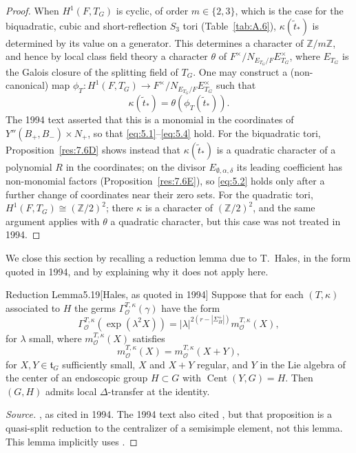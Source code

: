 \documentclass[12pt,letterpaper]{amsart}
\theoremstyle{plain}
\theoremstyle{definition}
\theoremstyle{remark}
\theoremstyle{definition}
\newcommand{\zzz}{\mathbb{Z}}
\DeclareMathOperator{\Cent}{Cent}
\begin{document}
\begin{proof}
When $H^1(F,T_G)$ is cyclic, of order $m\in \{2,3\}$, which is the case for
the biquadratic, cubic and short-reflection $S_3$ tori
(Table~\ref{tab:A.6}), $\kappa(\tilde{t}_*)$ is determined by its value on a
generator. This determines a character of $\zzz/m\zzz$, and
hence by local class field theory a
character $\theta$ of $F^\times/N_{E_{T_G}/F}E_{T_G}^\times$, where $E_{T_G}$
is the Galois closure of the splitting field of $T_G$. One may
construct a (non-canonical) map
$\phi_T:H^1(F,T_G) \rightarrow F^\times/N_{E_{T_G}/F}E_{T_G}^\times$
such that
\[
\kappa(\tilde{t}_*)=\theta(\phi_T(\tilde{t}_*)).
\]
The 1994 text asserted that this is a monomial in the coordinates of
$Y''(B_+,B_-)\times N_+$, so that \eqref{eq:5.1}--\eqref{eq:5.4} hold. For
the biquadratic tori, Proposition~\ref{res:7.6D} shows instead that
$\kappa(\tilde t_*)$ is a quadratic character of a polynomial $R$ in the
coordinates; on the divisor $E_{\emptyset,\alpha,\delta}$ its leading
coefficient has non-monomial factors (Proposition~\ref{res:7.6E}), so
\eqref{eq:5.2} holds only after a further change of coordinates near their
zero sets.
For the quadratic tori, $H^1(F,T_G)\cong(\zzz/2)^2$; there $\kappa$ is a
character of $(\zzz/2)^2$, and the same argument applies with $\theta$ a
quadratic character, but this case was not treated in 1994.
\end{proof}

We close this section by recalling a reduction lemma
due to T.~Hales, in the form quoted in 1994, and by explaining why it does
not apply here.

\begin{res}{Reduction Lemma}{5.19}[Hales, as quoted in 1994]\label{res:5.19}
Suppose that for each $(T,\kappa)$
associated to $H$
the germs $\Gamma_{{\mathcal O}}^{T,\kappa}(\gamma)$ have the form
\[
\Gamma_{{\mathcal O}}^{T,\kappa}(\exp(\lambda^2 X))=
|\lambda|^{2(r-|\Sigma_H^+|)}m_{{\mathcal O}}^{T,\kappa}(X),
\]
for $\lambda$ small, where $m_{{\mathcal O}}^{T,\kappa}(X)$ satisfies
\[
m_{{\mathcal O}}^{T,\kappa}(X)=m_{{\mathcal O}}^{T,\kappa}(X+Y),
\]
for $X,Y\in {\mathfrak t}_G$ sufficiently small, $X$ and $X+Y$ regular,
and $Y$ in the Lie algebra of the center
of an endoscopic group $H\subset G$ with $\Cent(Y,G)=H$.
Then $(G,H)$ admits local
$\Delta$-transfer at the identity.
\end{res}

\begin{proof}[Source]
\cite[Lemma~6.1]{Ha92b}, as cited in 1994. The 1994 text also cited
\cite[Proposition~2.11]{Ha89}, but that proposition is a quasi-split
reduction to the centralizer of a semisimple element, not this lemma. This
lemma implicitly uses \cite{LS90}.
\end{proof}
\end{document}

